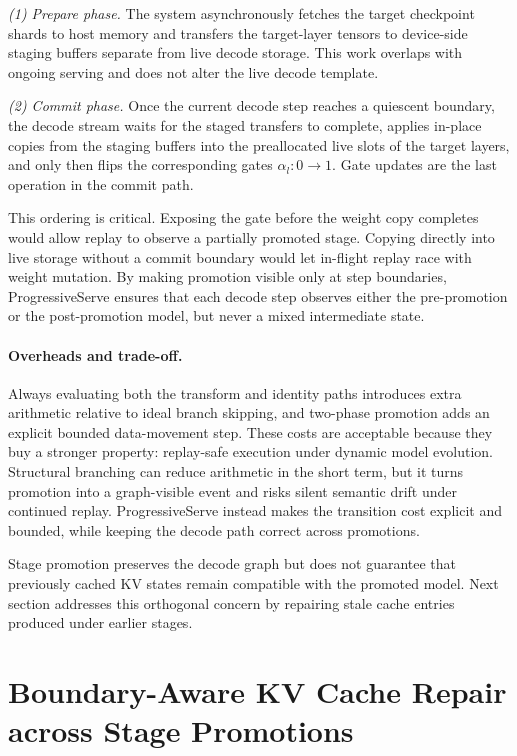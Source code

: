 \documentclass[sigplan,anonymous,review,nonacm]{acmart}
\begin{document}
\emph{(1) Prepare phase.}
The system asynchronously fetches the target checkpoint shards to host memory and transfers the target-layer tensors to device-side staging buffers separate from live decode storage. This work overlaps with ongoing serving and does not alter the live decode template.

\emph{(2) Commit phase.}
Once the current decode step reaches a quiescent boundary, the decode stream waits for the staged transfers to complete, applies in-place copies from the staging buffers into the preallocated live slots of the target layers, and only then flips the corresponding gates $\alpha_l : 0 \rightarrow 1$. Gate updates are the last operation in the commit path.

This ordering is critical. Exposing the gate before the weight copy completes would allow replay to observe a partially promoted stage. Copying directly into live storage without a commit boundary would let in-flight replay race with weight mutation. By making promotion visible only at step boundaries, ProgressiveServe ensures that each decode step observes either the pre-promotion or the post-promotion model, but never a mixed intermediate state.

\paragraph{Overheads and trade-off.}
Always evaluating both the transform and identity paths introduces extra arithmetic relative to ideal branch skipping, and two-phase promotion adds an explicit bounded data-movement step. These costs are acceptable because they buy a stronger property: replay-safe execution under dynamic model evolution. Structural branching can reduce arithmetic in the short term, but it turns promotion into a graph-visible event and risks silent semantic drift under continued replay. ProgressiveServe instead makes the transition cost explicit and bounded, while keeping the decode path correct across promotions.

Stage promotion preserves the decode graph but does not guarantee that previously cached KV states remain compatible with the promoted model. Next section addresses this orthogonal concern by repairing stale cache entries produced under earlier stages.


\section{Boundary-Aware KV Cache Repair across Stage Promotions}
\label{sec:kv_repair}
\end{document}
